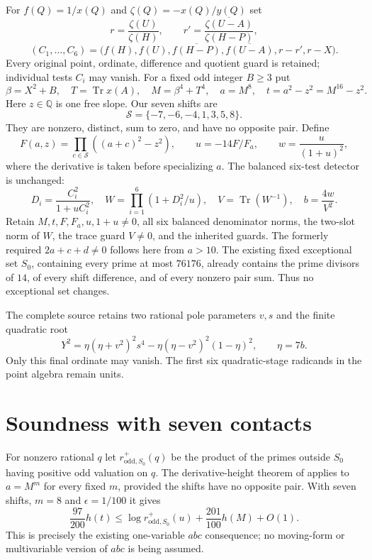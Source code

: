 \documentclass[11pt,a4paper]{article}
\newcommand{\Q}{\mathbb Q}\newcommand{\Z}{\mathbb Z}
\DeclareMathOperator{\Tr}{Tr}
\begin{document}
For $f(Q)=1/x(Q)$ and $\zeta(Q)=-x(Q)/y(Q)$ set
\[
 r=\frac{\zeta(U)}{\zeta(H)},\qquad
 r'=\overline{\frac{\zeta(U-A)}{\zeta(H-P)}},
\]
\[
 (C_1,\ldots,C_6)=
 \bigl(f(H),f(U),\overline{f(H-P)},\overline{f(U-A)},r-r',r-X\bigr).
\]
Every original point, ordinate, difference and quotient guard is retained;
individual tests $C_i$ may vanish. For a fixed odd integer $B\ge3$ put
\begin{equation}\label{eq:height}
 \beta=X^2+B,\quad T=\Tr x(A),\quad M=\beta^4+T^4,
 \quad a=M^8,\quad t=a^2-z^2=M^{16}-z^2.
\end{equation}
Here $z\in\Q$ is one free slope. Our seven shifts are
\[
 \mathcal S=\{-7,-6,-4,1,3,5,8\}.
\]
They are nonzero, distinct, sum to zero, and have no opposite pair.
Define
\begin{equation}\label{eq:weight}
 F(a,z)=\prod_{c\in\mathcal S}((a+c)^2-z^2),\qquad
 u=-14F/F_a,\qquad w=\frac{u}{(1+u)^2},
\end{equation}
where the derivative is taken before specializing $a$. The balanced
six-test detector is unchanged:
\begin{equation}\label{eq:detector}
 D_i=\frac{C_i^2}{1+uC_i^2},\quad
 W=\prod_{i=1}^6(1+D_i^2/u),\quad
 V=\Tr(W^{-1}),\quad b=\frac{4w}{V^2}.
\end{equation}
Retain $M,t,F,F_a,u,1+u\ne0$, all six balanced denominator norms,
the two-slot norm of $W$, the trace guard $V\ne0$, and the inherited
guards. The formerly required $2a+c+d\ne0$ follows here from $a>10$.
The existing fixed exceptional set $S_0$, containing every prime at most
$76176$, already contains the prime divisors of $14$, of every shift
difference, and of every nonzero pair sum. Thus no exceptional set changes.

The complete source retains two rational pole parameters $v,s$ and the
finite quadratic root
\begin{equation}\label{eq:pole}
 Y^2=\eta(\eta+v^2)^2s^4-\eta(\eta-v^2)^2(1-\eta)^2,
 \qquad \eta=7b.
\end{equation}
Only this final ordinate may vanish. The first six quadratic-stage
radicands in the point algebra remain units.

\section{Soundness with seven contacts}
For nonzero rational $q$ let $r^+_{\mathrm{odd},S_0}(q)$ be the product
of the primes outside $S_0$ having positive odd valuation on $q$.
The derivative-height theorem of \cite[Theorem 2.1]{Derivative} applies
to $a=M^m$ for every fixed $m$, provided the shifts have no opposite
pair. With seven shifts, $m=8$ and $\epsilon=1/100$ it gives
\begin{equation}\label{eq:radical}
 \frac{97}{200}h(t)
 \le \log r^+_{\mathrm{odd},S_0}(u)+\frac{201}{100}h(M)+O(1).
\end{equation}
This is precisely the existing one-variable $abc$ consequence; no
moving-form or multivariable version of $abc$ is being assumed.
\end{document}
